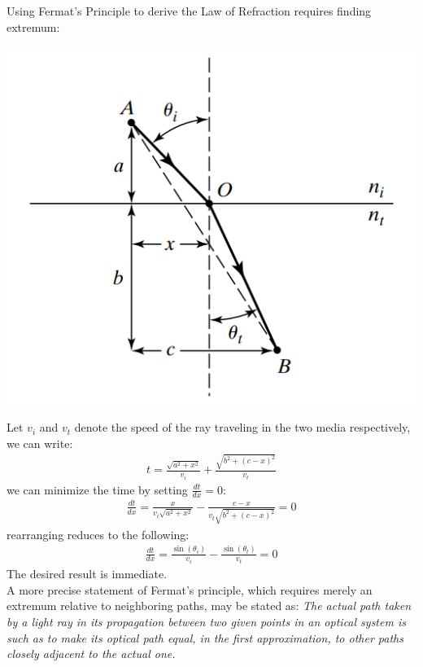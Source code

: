 \documentclass[11pt]{book}
\theoremstyle{break}
\theoremstyle{break}
\begin{document}
Using Fermat's Principle to derive the Law of Refraction requires finding extremum:
\begin{center}
\includegraphics[scale=0.55]{Fermat2.png}
\end{center}
Let $v_i$ and $v_t$ denote the speed of the ray traveling in the two media respectively, we can write:
\begin{align*}
t = \frac{\sqrt{a^2 +x^2}}{v_i} + \frac{\sqrt{b^2 + (c-x)^2}}{v_t}
\end{align*}
we can minimize the time by setting $\frac{dt}{dx} = 0$:
\begin{align*}
\frac{dt}{dx} = \frac{x}{v_i\sqrt{a^2 +x^2}} - \frac{c-x}{v_t \sqrt{b^2 +(c-x)^2}} = 0
\end{align*}
rearranging reduces to the following:
\begin{align*}
\frac{dt}{dx} = \frac{\sin(\theta_i)}{v_i} - \frac{\sin(\theta_t)}{v_t} = 0
\end{align*}
The desired result is immediate. \\

A more precise statement of Fermat's principle, which requires merely an extremum relative to neighboring paths, may be stated as: \textit{The actual path taken by a light ray in its propagation between two given points in an optical system is such as to make its optical path equal, in the first approximation, to other paths closely adjacent to the actual one.}
\end{document}
